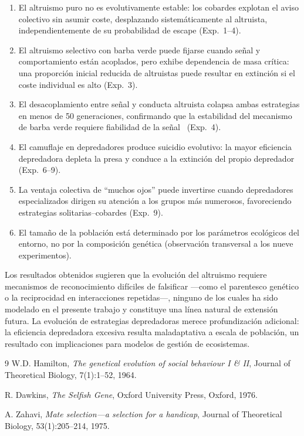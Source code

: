 \documentclass[11pt,a4paper]{article}
\begin{document}
\begin{enumerate}
    \item El altruismo puro no es evolutivamente estable: los cobardes explotan el aviso colectivo sin asumir coste, desplazando sistem\'aticamente al altruista, independientemente de su probabilidad de escape (Exp.~1--4).

    \item El altruismo selectivo con barba verde puede fijarse cuando se\~nal y comportamiento est\'an acoplados, pero exhibe dependencia de masa cr\'itica: una proporci\'on inicial reducida de altruistas puede resultar en extinci\'on si el coste individual es alto (Exp.~3).

    \item El desacoplamiento entre se\~nal y conducta altruista colapsa ambas estrategias en menos de 50 generaciones, confirmando que la estabilidad del mecanismo de barba verde requiere fiabilidad de la se\~nal~\cite{zahavi1975} (Exp.~4).

    \item El camuflaje en depredadores produce suicidio evolutivo: la mayor eficiencia depredadora depleta la presa y conduce a la extinci\'on del propio depredador (Exp.~6--9).

    \item La ventaja colectiva de ``muchos ojos'' puede invertirse cuando depredadores especializados dirigen su atenci\'on a los grupos m\'as numerosos, favoreciendo estrategias solitarias--cobardes (Exp.~9).

    \item El tama\~no de la poblaci\'on est\'a determinado por los par\'ametros ecol\'ogicos del entorno, no por la composici\'on gen\'etica (observaci\'on transversal a los nueve experimentos).
\end{enumerate}

\medskip
Los resultados obtenidos sugieren que la evoluci\'on del altruismo requiere mecanismos de reconocimiento dif\'iciles de falsificar
---como el parentesco gen\'etico o la reciprocidad en interacciones repetidas---,
ninguno de los cuales ha sido modelado en el presente trabajo y constituye una l\'inea natural de extensi\'on futura.
La evoluci\'on de estrategias depredadoras merece profundizaci\'on adicional: la eficiencia depredadora excesiva resulta maladaptativa
a escala de poblaci\'on, un resultado con implicaciones para modelos de gesti\'on de ecosistemas.

\begin{thebibliography}{9}
    W.D. Hamilton, \textit{The genetical evolution of social behaviour I \& II},
    Journal of Theoretical Biology, 7(1):1--52, 1964.

    R. Dawkins, \textit{The Selfish Gene},
    Oxford University Press, Oxford, 1976.

    A. Zahavi, \textit{Mate selection---a selection for a handicap},
    Journal of Theoretical Biology, 53(1):205--214, 1975.
\end{thebibliography}
\end{document}
